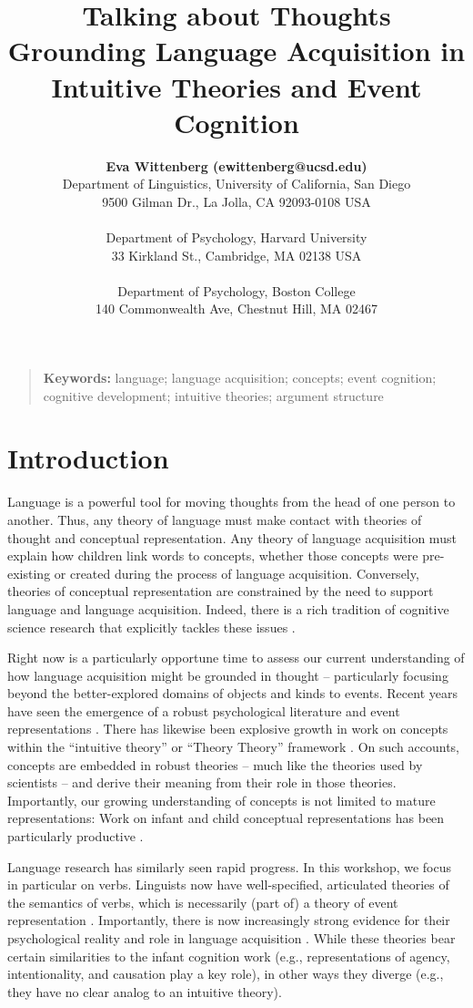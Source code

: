 \documentclass[10pt,letterpaper]{article}
\title{Talking about Thoughts\\ Grounding Language Acquisition in Intuitive Theories and Event Cognition}
\author{{\large \bf Eva Wittenberg (ewittenberg@ucsd.edu)} \\
  Department of Linguistics,
  University of California, San Diego \\
  9500 Gilman Dr.,
  La Jolla, CA 92093-0108 USA \\
  \AND {\large \bf Melissa Kline (mekline@mit.edu)} \\
  Department of Psychology,
  Harvard University \\
  33 Kirkland St.,
  Cambridge, MA 02138 USA \\
  \AND {\large \bf Joshua K. Hartshorne (joshua.hartshorne@bc.edu)} \\
  Department of Psychology,
  Boston College \\
  140 Commonwealth Ave,
  Chestnut Hill, MA 02467}
\begin{document}
\maketitle

\begin{quote}
\small
\textbf{Keywords:}
language; language acquisition; concepts; event cognition; cognitive
development; intuitive theories; argument structure
\end{quote}

\section{Introduction}

Language is a powerful tool for moving thoughts from the
head of one person to another. Thus, any theory of language must make
contact with theories of thought and conceptual representation. Any
theory of language acquisition must explain how children link words to
concepts, whether those concepts were pre-existing or created during
the process of language acquisition. Conversely, theories of
conceptual representation are constrained by the need to support
language and language acquisition. Indeed, there is a rich tradition
of cognitive science research that explicitly tackles these issues \cite{Pinker1989,Clark2004,Bowerman1989}.

Right now is a particularly opportune time to assess our
current understanding of how language acquisition might be grounded in
thought -- particularly focusing beyond the better-explored domains of
objects and kinds to events. Recent years have seen the emergence of a
robust psychological literature and event representations \cite{Radvansky2014}. There has
likewise been explosive growth in work on concepts within the
``intuitive theory'' or ``Theory Theory'' framework
\cite{Gopnikinpress,Battaglia2013,HOT2015}. On such accounts, concepts are
embedded in robust theories -- much like the theories used by
scientists -- and derive their meaning from their role in those
theories. Importantly, our growing understanding of concepts
is not limited to mature representations: Work on infant and child
conceptual representations has been particularly productive \cite{Gopnikinpress,Ettinger,Henrik2015}.

Language research has similarly seen rapid progress. In this workshop,
we focus in particular on verbs. Linguists now have well-specified,
articulated theories of the semantics of verbs, which is necessarily
(part of) a theory of event representation \cite{Levin2011,Levin2005}. Importantly, there is now increasingly strong evidence for their psychological reality and role in language acquisition
\cite{Ambridge2013,HOSULS}. While these theories bear certain
similarities to the infant cognition work (e.g., representations of
agency, intentionality, and causation play a key role), in other ways
they diverge (e.g., they have no clear analog to an intuitive theory).
\end{document}
